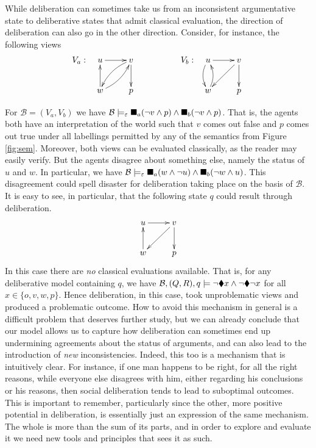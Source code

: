 \documentclass[greybox]{svmult}
\newcommand{\views}{\mathcal B}
\newcommand{\sem}{\varepsilon}
\begin{document}
\begin{example}\label{ex:ad}
While deliberation can sometimes take us from an inconsistent argumentative state to deliberative states that admit classical evaluation, the direction of deliberation can also go in the other direction. Consider, for instance, the following views
$$
\begin{array}{llll}
V_a: & \xymatrix{ u \ar[r] & v \ar@/_/[dl] \ar[d] \\ w \ar@/_/[ur] \ar[u] & p } &\hspace{1.5cm} V_b: & \xymatrix{u \ar@/_/[d] \ar[r] & v \ar[d] \ar[dl] \\ w \ar@/_/[u] & p }
\end{array}
$$

For $\views = (V_a,V_ b)$ we have $\views \models_\sem \cbox_a (\neg v \land p) \land \cbox_b (\neg v \land p)$. That is, the agents both have an interpretation of the world such that $v$ comes out false and $p$ comes out true under all labellings permitted by any of the semantics from Figure \ref{fig:sem}. Moreover, both views can be evaluated classically, as the reader may easily verify. But the agents disagree about something else, namely the status of $u$ and $w$. In particular, we have $\views \models_\sem \cbox_a (w \land \neg u) \land \cbox_b (\neg w \land u)$. This disagreement could spell disaster for deliberation taking place on the basis of $\views$. It is easy to see, in particular, that the following state $q$ could result through deliberation.
$$
\xymatrix{  u \ar[r] & v \ar[d] \ar[dl] \\ w \ar[u] & p }
$$
In this case there are \emph{no} classical evaluations available. That is, for any deliberative model containing $q$, we have $\views, (Q,R), q \models \neg \cdia x \land \neg \cdia \neg x$ for all $x \in \{o,v,w,p\}$. Hence deliberation, in this case, took unproblematic views and produced a problematic outcome. How to avoid this mechanism in general is a difficult problem that deserves further study, but we can already conclude that our model allows us to capture how deliberation can sometimes end up undermining agreements about the status of arguments, and can also lead to the introduction of \emph{new} inconsistencies. Indeed, this too is a mechanism that is intuitively clear. For instance, if one man happens to be right, for all the right reasons, while everyone else disagrees with him, either regarding his conclusions or his reasons, then social deliberation tends to  lead to suboptimal outcomes. This is important to remember, particularly since the other, more positive potential in deliberation, is essentially just an expression of the same mechanism. The whole is more than the sum of its parts, and in order to explore and evaluate it we need new tools and principles that sees it as such.
\end{example}
\end{document}
